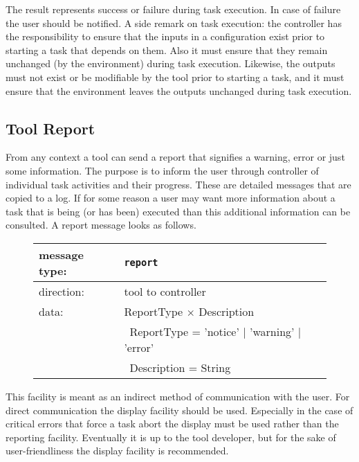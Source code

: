\documentclass{article}
\newcommand{\msg}[1]{\texttt{#1}}
\begin{document}
   \noindent The result represents success or failure during task execution. In
   case of failure the user should be notified. A side remark on task
   execution: the controller has the responsibility to ensure that the inputs
   in a configuration exist prior to starting a task that depends on them. Also
   it must ensure that they remain unchanged (by the environment) during task
   execution. Likewise, the outputs must not exist or be modifiable by the tool
   prior to starting a task, and it must ensure that the environment leaves the
   outputs unchanged during task execution.

  \subsection{Tool Report}

   From any context a tool can send a report that signifies a warning, error or
   just some information. The purpose is to inform the user through controller
   of individual task activities and their progress. These are detailed
   messages that are copied to a log. If for some reason a user may want more
   information about a task that is being (or has been) executed than this
   additional information can be consulted. A report message looks as follows.
   
   \begin{figure}[H]
    \begin{center}
     \begin{tabular}{|ll|}
      \hline
       message type:   & \msg{report} \\
      \hline
       direction:      & tool to controller \\
       data:           & ReportType $\times$ Description \\
                       & \ ReportType = 'notice' $|$ 'warning' $|$ 'error' \\
                       & \ Description = String \\
      \hline
     \end{tabular}
    \end{center}
   \end{figure}
   \vspace{-0.3cm}

   \noindent This facility is meant as an indirect method of communication with
   the user.  For direct communication the display facility should be used.
   Especially in the case of critical errors that force a task abort the
   display must be used rather than the reporting facility. Eventually it is up
   to the tool developer, but for the sake of user-friendliness the display
   facility is recommended.
\end{document}
